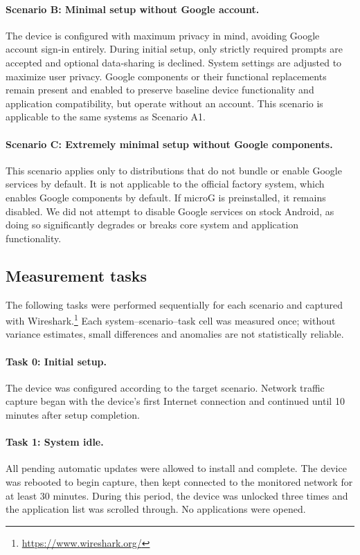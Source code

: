 \paragraph{Scenario B: Minimal setup without Google account.}
The device is configured with maximum privacy in mind, avoiding Google account sign-in entirely. During initial setup, only strictly required prompts are accepted and optional data-sharing is declined. System settings are adjusted to maximize user privacy. Google components or their functional replacements remain present and enabled to preserve baseline device functionality and application compatibility, but operate without an account. This scenario is applicable to the same systems as Scenario A1.

\paragraph{Scenario C: Extremely minimal setup without Google components.}
This scenario applies only to distributions that do not bundle or enable Google services by default. It is not applicable to the official factory system, which enables Google components by default. If microG is preinstalled, it remains disabled. We did not attempt to disable Google services on stock Android, as doing so significantly degrades or breaks core system and application functionality.

\subsection{Measurement tasks}
The following tasks were performed sequentially for each scenario and captured with Wireshark.\footnote{\url{https://www.wireshark.org/}} Each system--scenario--task cell was measured once; without variance estimates, small differences and anomalies are not statistically reliable.

\paragraph{Task 0: Initial setup.}
The device was configured according to the target scenario. Network traffic capture began with the device's first Internet connection and continued until 10 minutes after setup completion.

\paragraph{Task 1: System idle.}
All pending automatic updates were allowed to install and complete. The device was rebooted to begin capture, then kept connected to the monitored network for at least 30 minutes. During this period, the device was unlocked three times and the application list was scrolled through. No applications were opened.

